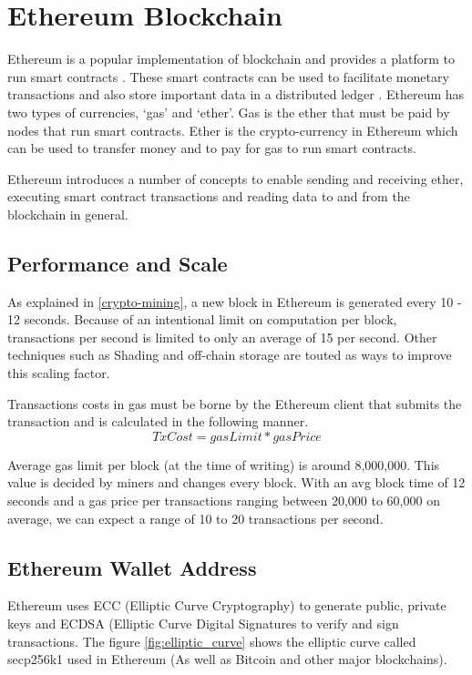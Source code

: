\documentclass[11pt,openright]{report}
\begin{document}
\section{Ethereum Blockchain}
Ethereum is a popular implementation of blockchain and provides a platform to run smart contracts \cite{buterin2013whitepaper}. These smart contracts can be used to facilitate monetary transactions and also store important data in a distributed ledger \cite{egbertsen2016replacing}. Ethereum has two types of currencies, ‘gas’ and ‘ether’. Gas is the ether that must be paid by nodes that run smart contracts. Ether is the crypto-currency in Ethereum which can be used to transfer money and to pay for gas to run smart contracts.

Ethereum introduces a number of concepts to enable sending and receiving ether, executing smart contract transactions and reading data to and from the blockchain in general.

\subsection{Performance and Scale}
As explained in \ref{crypto-mining}, a new block in Ethereum is generated every 10 - 12 seconds. Because of an intentional limit on computation per block, transactions per second is limited to only an average of 15 per second. Other techniques such as Shading and off-chain storage are touted as ways to improve this scaling factor. 

Transactions costs in gas must be borne by the Ethereum client that submits the transaction and is calculated in the following manner.
\begin{equation}
    TxCost = gasLimit * gasPrice
\end{equation}

Average gas limit per block (at the time of writing) is around 8,000,000. This value is decided by miners and changes every block. With an avg block time of 12 seconds and a gas price per transactions ranging between 20,000 to 60,000 on average, we can expect a range of 10 to 20 transactions per second. 

\subsection{Ethereum Wallet Address}
Ethereum uses ECC (Elliptic Curve Cryptography) to generate public, private keys and ECDSA (Elliptic Curve Digital Signatures to verify and sign transactions. The figure \ref{fig:elliptic_curve} shows the elliptic curve called secp256k1 used in Ethereum (As well as Bitcoin and other major blockchains).
\end{document}
